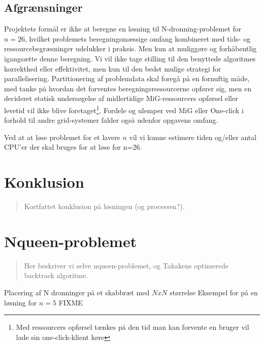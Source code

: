 \documentclass[a4,10pt]{article}
\def\chs#1{{\chessfont#1}}
\begin{document}
\subsection{Afgrænsninger}\label{afgænsninger}
%

Projektets formål er ikke at beregne en løsning til N-dronning-problemet for $n=26$, hvilket problemets beregningsmæssige omfang kombineret med tids- og ressourcebegræsninger udelukker i praksis. Men kun at muliggøre og forhåbentlig igangsætte denne beregning.
Vi vil ikke tage stilling til den benyttede algoritmes korrekthed eller effektivitet, men kun til den bedst mulige strategi for parallelisering. Partitionering af problemdata skal foregå på en fornuftig måde, med tanke på hvordan det forventes beregningsressourcerne opfører sig, men en decideret statisk undersøgelse af midlertidige MiG-ressourcers opførsel eller levetid vil ikke blive foretaget\footnote{Med ressourcers opførsel tænkes på den tid man kan forvente en bruger vil lade sin one-click-klient køre}. Fordele og ulemper ved MiG eller One-click i forhold til andre grid-systemer falder også udenfor opgavens omfang.

Ved at at løse problemet for et lavere $n$ vil vi kunne estimere tiden og/eller antal CPU'er der skal bruges for at løse for n=26.



\section{Konklusion}\label{konklusion}
\begin{verse}
	Kortfattet konklusion på løsningen (og processen?).
\end{verse}



\section{Nqueen-problemet}\label{nqueenproblemet}
\begin{verse}
	Her beskriver vi selve nqueen-problemet, og Takakens optimerede backtrack algoritme.
\end{verse}

Placering af N dronninger på et skabbræt med $NxN$ størrelse
Eksempel for på en løsning for $n=5$
FIXME
\end{document}
